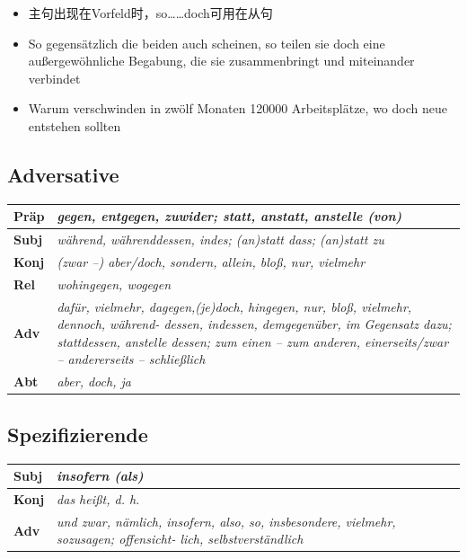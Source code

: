 \documentclass[UTF8]{report}
\begin{document}
\begin{itemize}
    \item 主句出现在Vorfeld时，so……doch可用在从句
    \item So gegensätzlich die beiden auch scheinen, so teilen sie doch eine außergewöhnliche Begabung, die sie zusammenbringt und miteinander verbindet
    \item Warum verschwinden in zwölf Monaten 120000 Arbeitsplätze, wo doch neue entstehen sollten
\end{itemize}

\subsection{Adversative}
\begin{longtable}{|>{\raggedright\arraybackslash}p{1cm}|>{\raggedright\arraybackslash}p{12cm}|}

\hline
\textbf{Präp} & \textit{gegen, entgegen, zuwider; statt, anstatt, anstelle (von)} \\
\hline
\textbf{Subj} & \textit{während, währenddessen, indes; (an)statt dass; (an)statt zu} \\
\hline
\textbf{Konj} & \textit{(zwar --) aber/doch, sondern, allein, bloß, nur, vielmehr} \\
\hline
\textbf{Rel} & \textit{wohingegen, wogegen} \\
\hline
\textbf{Adv} & \textit{dafür, vielmehr, dagegen,(je)doch, hingegen, nur, bloß, vielmehr, dennoch, während- dessen, indessen, demgegenüber, im Gegensatz dazu; stattdessen, anstelle dessen; zum einen -- zum anderen, einerseits/zwar -- andererseits -- schließlich} \\
\hline
\textbf{Abt} & \textit{aber, doch, ja} \\
\hline
\end{longtable}

\subsection{Spezifizierende}
\begin{longtable}{|>{\raggedright\arraybackslash}p{1cm}|>{\raggedright\arraybackslash}p{12cm}|}

\hline
\textbf{Subj} & \textit{insofern (als)} \\
\hline
\textbf{Konj} & \textit{das heißt, d. h.} \\
\hline
\textbf{Adv} & \textit{und zwar, nämlich, insofern, also, so, insbesondere, vielmehr, sozusagen; offensicht- lich, selbstverständlich} \\
\hline

\end{longtable}
\end{document}
